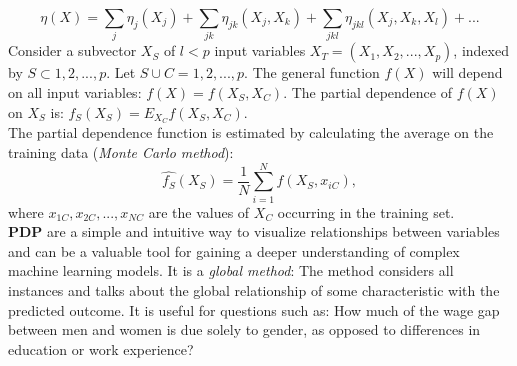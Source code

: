 \documentclass[12pt, letterpaper, twoside]{article}
\begin{document}
\begin{equation*}
\eta(X)=\sum_j \eta_j(X_j)+\sum_{jk} \eta_{jk}(X_j,X_k)+\sum_{jkl}\eta_{jkl}(X_j,X_k,X_l)+...
\end{equation*}
\hspace*{4ex} Consider a subvector $X_S$ of $l<p$ input variables $X_T=(X_1, X_2,...,X_p)$, indexed by $S\subset 1,2,...,p$. Let $S \cup C = 1, 2, ..., p$. The general function $f(X)$ will depend on all input variables: $f(X)=f(X_S,X_C)$. The partial dependence of $f(X)$ on $X_S$ is: $f_S(X_S) = E_{X_C} f(X_S,X_C)$.\\
\hspace*{4ex}The partial dependence function is estimated by calculating the average on the training data (\emph{Monte Carlo method}):
\begin{equation*}
\hat{f_S}(X_S)=\frac{1}{N}\sum_{i=1}^N f(X_S,x_{iC}),
\end{equation*}
where $x_{1C}, x_{2C},...,x_{NC}$ are the values of $X_C$ occurring in the training set.\\
\hspace*{4ex} \textbf{PDP} are a simple and intuitive way to visualize relationships between variables and can be a valuable tool for gaining a deeper understanding of complex machine learning models. It is a \emph{global method}: The method considers all instances and talks about the global relationship of some characteristic with the predicted outcome. It is useful for questions such as: How much of the wage gap between men and women is due solely to gender, as opposed to differences in education or work experience?
\end{document}
